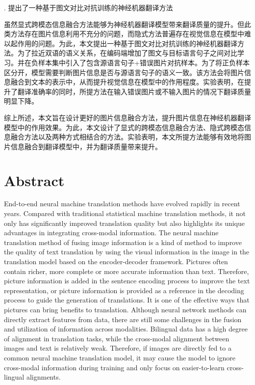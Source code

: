 {. 提出了一种基于图文对比对抗训练的神经机器翻译方法}

虽然显式跨模态信息融合方法能够为神经机器翻译模型带来翻译质量的提升。但此类方法存在图片信息利用不充分的问题，而隐式方法普遍存在视觉信息在模型中难以起作用的问题。为此，本文提出一种基于图文对比对抗训练的神经机器翻译方法。为了拉近双语的语义关系，在编码端增加了图文与目标语言句子之间对比学习。并在负样本集中引入了包含源语言句子+错误图片对抗样本。为了将正负样本区分开，模型需要判断图片信息是否与源语言句子的语义一致。该方法会将图片信息融合到文本的表示中，从而提升视觉信息在模型中的作用程度。实验表明，在提升了翻译准确率的同时，所提方法在输入错误图片或不输入图片的情况下翻译质量明显下降。

综上所述，本文旨在设计更好的图片信息融合方法，提升图片信息在神经机器翻译模型中的作用效果。为此，本文设计了显式的跨模态信息融合方法、隐式跨模态信息融合方法以及两种方式相结合的方法。实验表明，本文所提方法能够有效地将图片信息融合到翻译模型中，并为翻译质量带来提升。

\intobmk\chapter*{Abstract}%

End-to-end neural machine translation methods have evolved rapidly in recent years. Compared with traditional statistical machine translation methods, it not only has significantly improved translation quality but also highlights its unique advantages in integrating cross-modal information. The neural machine translation method of fusing image information is a kind of method to improve the quality of text translation by using the visual information in the image in the translation model based on the encoder-decoder framework. Pictures often contain richer, more complete or more accurate information than text. Therefore, picture information is added in the sentence encoding process to improve the text representation, or picture information is provided as a reference in the decoding process to guide the generation of translations. It is one of the effective ways that pictures can bring benefits to translation. Although neural network methods can directly extract features from data, there are still some challenges in the fusion and utilization of information across modalities. Bilingual data has a high degree of alignment in translation tasks, while the cross-modal alignment between images and text is relatively weak. Therefore, if images are directly fed to a common neural machine translation model, it may cause the model to ignore cross-modal information during training and only focus on easier-to-learn cross-lingual alignments.

